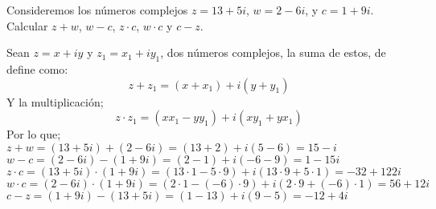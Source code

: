 \documentclass[twoside]{book}
\begin{document}
\begin{example}{}
    Consideremos los n\'umeros complejos $z=13+5i$, $w=2-6i$, y $c=1+9i$. Calcular $z+w$, $w-c$, $z\cdot c$, $w\cdot c$ y $c-z$.
\end{example}
\begin{sol}
    \begin{solucion}{}
        Sean $z=x+iy$ y $z_1=x_1+iy_1$, dos números complejos, la suma de estos, de define como:
        $$z+z_1=(x+x_1)+i(y+y_1)$$
        Y la multiplicaci\'on;
        $$z\cdot z_1=(xx_1-yy_1)+i(xy_1+yx_1)$$
        Por lo que;\\
        $z+w=(13+5i)+(2-6i)=(13+2)+i(5-6)=\boxed{15-i}$\\
        $w-c=(2-6i)-(1+9i)=(2-1)+i(-6-9)=\boxed{1-15i}$\\
        $z\cdot c=(13+5i)\cdot (1+9i)=(13\cdot 1-5\cdot 9)+i(13\cdot 9+5\cdot 1)=\boxed{-32+122i}$\\
        $w\cdot c=(2-6i)\cdot (1+9i)=(2\cdot 1-(-6)\cdot 9)+i(2\cdot 9+(-6)\cdot 1)=\boxed{56+12i}$\\
        $c-z=(1+9i)-(13+5i)=(1-13)+i(9-5)=\boxed{-12+4i}$

    \end{solucion}
\end{sol}
\end{document}
